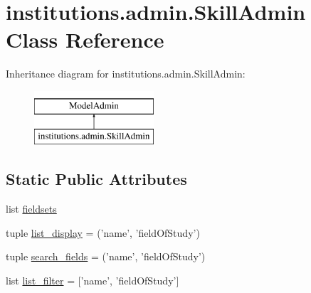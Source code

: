 \hypertarget{classinstitutions_1_1admin_1_1_skill_admin}{\section{institutions.\-admin.\-Skill\-Admin Class Reference}
\label{classinstitutions_1_1admin_1_1_skill_admin}
}
Inheritance diagram for institutions.\-admin.\-Skill\-Admin\-:\begin{figure}[H]
\begin{center}
\leavevmode
\includegraphics[height=2.000000cm]{classinstitutions_1_1admin_1_1_skill_admin}
\end{center}
\end{figure}
\subsection*{Static Public Attributes}
\begin{DoxyCompactItemize}
\item 
list \hyperlink{classinstitutions_1_1admin_1_1_skill_admin_aa478f20124aeecef7eb329ed69c73ee1}{fieldsets}
\item 
tuple \hyperlink{classinstitutions_1_1admin_1_1_skill_admin_adb8ac69960e1bc0ab537dc47cd5e557a}{list\-\_\-display} = ('name', 'field\-Of\-Study')
\item 
tuple \hyperlink{classinstitutions_1_1admin_1_1_skill_admin_a0371db06f45679601d046542991c51ad}{search\-\_\-fields} = ('name', 'field\-Of\-Study')
\item 
list \hyperlink{classinstitutions_1_1admin_1_1_skill_admin_a1fe2d6d3fdc0922978f12eb033fa5adb}{list\-\_\-filter} = \mbox{[}'name', 'field\-Of\-Study'\mbox{]}
\end{DoxyCompactItemize}


